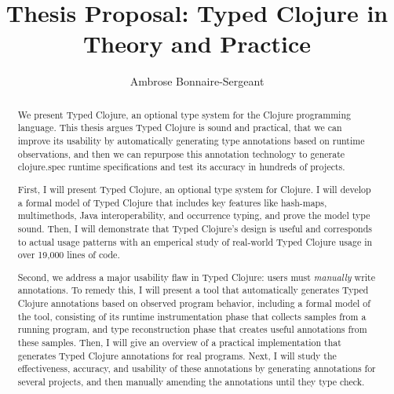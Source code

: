 \documentclass[9pt]{extarticle}
\title{Thesis Proposal: Typed Clojure in Theory and Practice}
\author{Ambrose Bonnaire-Sergeant}
\begin{document}
\maketitle

\begin{abstract}
We present Typed Clojure, an optional type system for the Clojure programming language.
This thesis argues Typed Clojure is sound and practical,
that we can improve its usability by automatically generating type annotations based on runtime observations,
and then we can repurpose this annotation technology to generate clojure.spec runtime specifications
and test its accuracy in hundreds of projects.

First, I will present Typed Clojure, an optional type system for Clojure.
I will develop a formal model of Typed Clojure that includes
key features like hash-maps, multimethods, Java interoperability, and occurrence typing,
and prove the model type sound.
Then, I will demonstrate that Typed Clojure's design is useful and corresponds to actual usage patterns
with an emperical study of real-world Typed Clojure usage in over 19,000 lines of code.

Second, we address a major usability flaw in Typed Clojure: users must \emph{manually}
write annotations.
To remedy this, 
I will present a tool that automatically generates Typed Clojure annotations based on observed
program behavior, including
a formal model of the tool, consisting of its runtime instrumentation phase that
collects samples from a running program, and type reconstruction phase
that creates useful annotations from these samples.
Then, I will give an overview of a practical implementation that generates Typed Clojure annotations for
real programs.
Next, I will study the effectiveness, accuracy, and usability of these annotations
by generating annotations for several projects, and then manually amending the annotations
until they type check.


\end{abstract}
\end{document}
